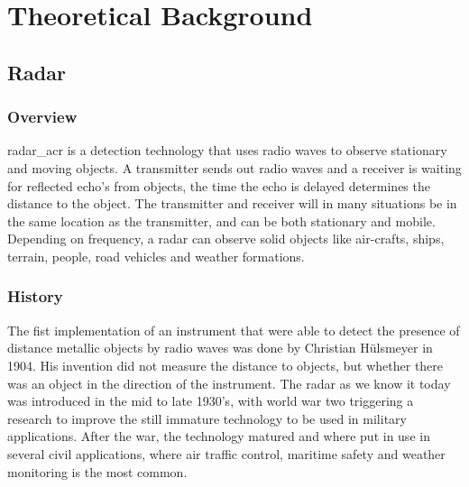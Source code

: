 
\chapter{Theoretical Background}\label{chapter:theoretical_background}
\section{Radar}
\subsection{Overview}
\gls{radar_acr} is a detection technology that uses radio waves to observe stationary and moving objects. A transmitter sends out radio waves and a receiver is waiting for reflected echo's from objects, the time the echo is delayed determines the distance to the object. The transmitter and receiver will in many situations be in the same location as the transmitter, and can be both stationary and mobile. Depending on frequency, a radar can observe solid objects like air-crafts, ships, terrain, people, road vehicles and weather formations.

\subsection{History}
The fist implementation of an instrument that were able to detect the presence of distance metallic objects by radio waves was done by Christian Hülsmeyer in 1904. His invention did not measure the distance to objects, but whether there was an object in the direction of the instrument. The radar as we know it today was introduced in the mid to late 1930's, with world war two triggering a research to improve the still immature technology to be used in military applications. After the war, the technology matured and where put in use in several civil applications, where air traffic control, maritime safety and weather monitoring is the most common.

